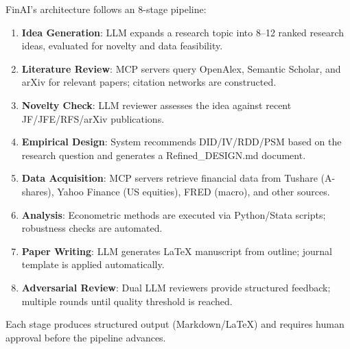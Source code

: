 \documentclass[12pt, a4paper]{article}
\begin{document}
FinAI's architecture follows an 8-stage pipeline:

\begin{enumerate}
    \item \textbf{Idea Generation}: LLM expands a research topic into 8--12 ranked research ideas, evaluated for novelty and data feasibility.
    \item \textbf{Literature Review}: MCP servers query OpenAlex, Semantic Scholar, and arXiv for relevant papers; citation networks are constructed.
    \item \textbf{Novelty Check}: LLM reviewer assesses the idea against recent JF/JFE/RFS/arXiv publications.
    \item \textbf{Empirical Design}: System recommends DID/IV/RDD/PSM based on the research question and generates a Refined\_DESIGN.md document.
    \item \textbf{Data Acquisition}: MCP servers retrieve financial data from Tushare (A-shares), Yahoo Finance (US equities), FRED (macro), and other sources.
    \item \textbf{Analysis}: Econometric methods are executed via Python/Stata scripts; robustness checks are automated.
    \item \textbf{Paper Writing}: LLM generates LaTeX manuscript from outline; journal template is applied automatically.
    \item \textbf{Adversarial Review}: Dual LLM reviewers provide structured feedback; multiple rounds until quality threshold is reached.
\end{enumerate}

Each stage produces structured output (Markdown/LaTeX) and requires human approval before the pipeline advances.
\end{document}

